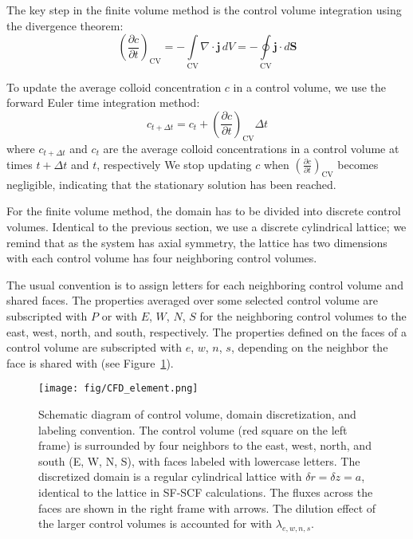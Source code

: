 \documentclass[10pt, a4paper]{article}
\begin{document}
\begin{multicols}{2}
The key step in the finite volume method is the control volume integration using the divergence theorem:
\begin{equation}
    \label{eq:CFD_integration_1}
    \left( \frac{\partial c}{\partial t} \right)_{\textrm{CV}} = -\int\limits_{\textrm{CV}} \nabla \cdot \mathbf{j} \, dV = -\oint\limits_{\textrm{CV}} \mathbf{j} \cdot d\mathbf{S}
\end{equation}

To update the average colloid concentration $c$ in a control volume, we use the forward Euler time integration method:
\begin{equation}
    c_{t + \Delta t} = c_t + \left( \frac{\partial c}{\partial t} \right)_{\textrm{CV}} \Delta t
\end{equation}
where $c_{t + \Delta t}$ and $c_t$ are the average colloid concentrations in a control volume at times $t + \Delta t$ and $t$, respectively
We stop updating $c$ when $\left( \frac{\partial c}{\partial t} \right)_{\textrm{CV}}$ becomes negligible, indicating that the stationary solution has been reached.

For the finite volume method, the domain has to be divided into discrete control volumes.
Identical to the previous section, we use a discrete cylindrical lattice; we remind that as the system has axial symmetry, the lattice has two dimensions with each control volume has four neighboring control volumes.

The usual convention is to assign letters for each neighboring control volume and shared faces.
The properties averaged over some selected control volume are subscripted with $P$ or with $E$, $W$, $N$, $S$ for the neighboring control volumes to the east, west, north, and south, respectively.
The properties defined on the faces of a control volume are subscripted with $e$, $w$, $n$, $s$, depending on the neighbor the face is shared with (see Figure~\ref{fig:CFD_element}).

\begin{figure}[H]
    \centering
    \texttt{[image: fig/CFD\_element.png]}
    \caption{
        Schematic diagram of control volume, domain discretization, and labeling convention.
        The control volume (red square on the left frame) is surrounded by four neighbors to the east, west, north, and south (E, W, N, S), with faces labeled with lowercase letters.
        The discretized domain is a regular cylindrical lattice with $\delta r = \delta z = a$, identical to the lattice in SF-SCF calculations.
        The fluxes across the faces are shown in the right frame with arrows.
        The dilution effect of the larger control volumes is accounted for with $\lambda_{e,w,n,s}$.
        }
    \label{fig:CFD_element}
\end{figure}


\end{multicols}
\end{document}
